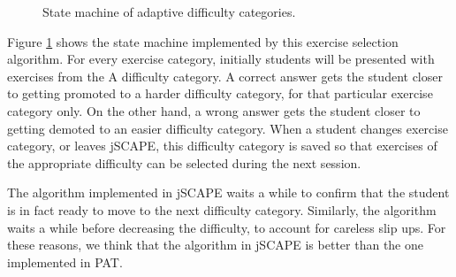 \begin{figure}[H]
\centering
{}
\caption{State machine of adaptive difficulty categories.}
\label{state-machine}
\end{figure}

Figure \ref{state-machine} shows the state machine implemented by this exercise selection algorithm. For every exercise category, initially students will be presented with exercises from the A difficulty category. A correct answer gets the student closer to getting promoted to a harder difficulty category, for that particular exercise category only. On the other hand, a wrong answer gets the student closer to getting demoted to an easier difficulty category. When a student changes exercise category, or leaves jSCAPE, this difficulty category is saved so that exercises of the appropriate difficulty can be selected during the next session. \newline

The algorithm implemented in jSCAPE waits a while to confirm that the student is in fact ready to move to the next difficulty category. Similarly, the algorithm waits a while before decreasing the difficulty, to account for careless slip ups. For these reasons, we think that the algorithm in jSCAPE is better than the one implemented in PAT. \newpage

